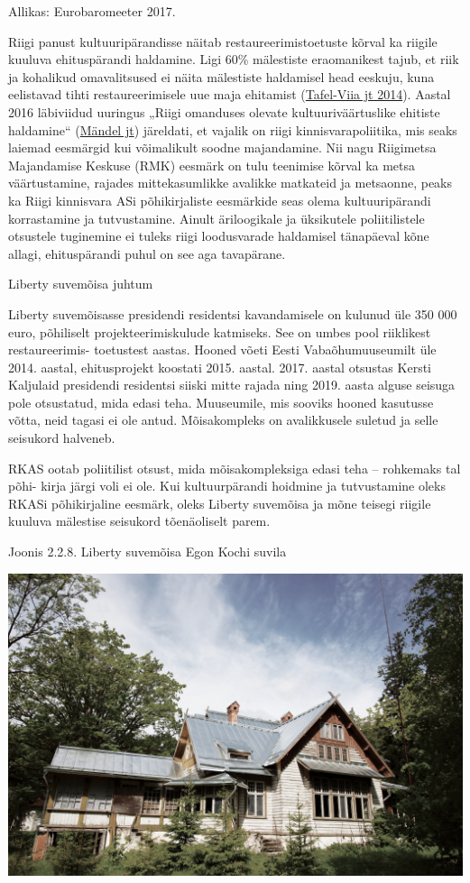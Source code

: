 \documentclass[estonian,]{article}
\begin{document}
\begin{imgsource}
{Allikas:} Eurobaromeeter 2017.
\end{imgsource}

Riigi panust kultuuripärandisse näitab restaureerimistoetuste kõrval ka riigile kuuluva ehituspärandi haldamine. Ligi 60\% mälestiste eraomanikest tajub, et riik ja kohalikud omavalitsused ei näita mälestiste haldamisel head eeskuju, kuna eelistavad tihti restaureerimisele uue maja ehitamist (\protect\hyperlink{Tafel2014}{Tafel-Viia jt 2014}).
Aastal 2016 läbiviidud uuringus „Riigi omanduses olevate kultuuriväärtuslike ehitiste haldamine`` (\protect\hyperlink{Muxe4ndel2016}{Mändel jt}) järeldati, et vajalik on riigi kinnisvarapoliitika, mis seaks laiemad eesmärgid kui võimalikult soodne majandamine. Nii nagu Riigimetsa Majandamise Keskuse (RMK) eesmärk on tulu teenimise kõrval ka metsa väärtustamine, rajades mittekasumlikke avalikke matkateid ja metsaonne, peaks ka Riigi kinnisvara ASi põhikirjaliste eesmärkide seas olema kultuuripärandi korrastamine ja tutvustamine. Ainult äriloogikale ja üksikutele poliitilistele otsustele tuginemine ei tuleks riigi loodusvarade haldamisel tänapäeval kõne allagi, ehituspärandi puhul on see aga tavapärane.

Liberty suvemõisa juhtum

Liberty suvemõisasse presidendi residentsi kavandamisele on kulunud üle 350 000 euro, põhiliselt projekteerimiskulude katmiseks. See on umbes pool riiklikest restaureerimis- toetustest aastas.
Hooned võeti Eesti Vabaõhumuuseumilt üle 2014. aastal, ehitusprojekt koostati 2015. aastal. 2017. aastal otsustas Kersti Kaljulaid presidendi residentsi siiski mitte rajada ning 2019. aasta alguse seisuga pole otsustatud, mida edasi teha. Muuseumile, mis sooviks hooned kasutusse võtta, neid tagasi ei ole antud. Mõisakompleks on avalikkusele suletud ja selle seisukord halveneb.

RKAS ootab poliitilist otsust, mida mõisakompleksiga edasi teha -- rohkemaks tal põhi- kirja järgi voli ei ole. Kui kultuurpärandi hoidmine ja tutvustamine oleks RKASi põhikirjaline eesmärk, oleks Liberty suvemõisa ja mõne teisegi riigile kuuluva mälestise seisukord tõenäoliselt parem.

{Joonis 2.2.8.} Liberty suvemõisa Egon Kochi suvila

\begin{center}\includegraphics[width=0.9\linewidth]{figures/2-chapter/fig228} \end{center}
\end{document}
